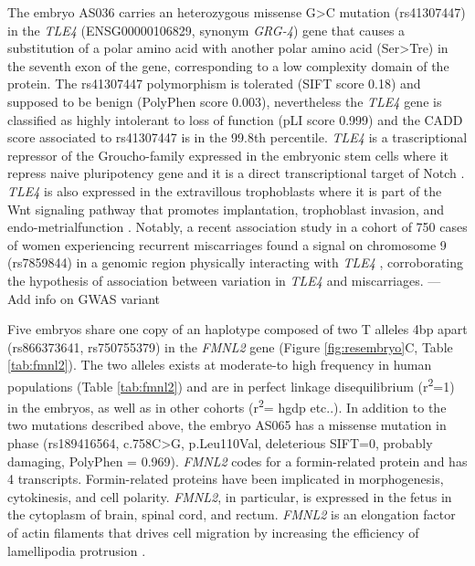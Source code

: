 \documentclass[fleqn,10pt]{wlscirep}
\begin{document}
The embryo AS036 carries an heterozygous missense G>C mutation (rs41307447) in the \textit{TLE4} (ENSG00000106829, synonym \textit{GRG-4}) gene that causes a substitution of a polar amino acid with another polar amino acid (Ser>Tre) in the seventh exon of the gene, corresponding to a low complexity domain of the protein. The rs41307447 polymorphism is tolerated (SIFT score 0.18) and supposed to be benign (PolyPhen score 0.003), nevertheless the \textit{TLE4} gene is classified as highly intolerant to loss of function (pLI score 0.999) and the CADD score associated to rs41307447 is in the 99.8th percentile. 
\textit{TLE4} is a trascriptional repressor of the Groucho-family expressed in the embryonic stem cells where it repress naive pluripotency gene \cite{laing2015gro} and it is a direct transcriptional target of Notch \cite{menchero2019transitions}. \textit{TLE4} is also expressed in the extravillous trophoblasts \cite{meinhardt2014wnt} where it is part of the Wnt signaling pathway that promotes implantation, trophoblast invasion, and endo-metrialfunction \cite{sonderegger2010wnt}. Notably, a recent association study in a cohort of 750 cases of women experiencing recurrent miscarriages found a signal on chromosome 9 (rs7859844) in a genomic region physically interacting with \textit{TLE4} \cite{laisk2019genetic}, corroborating the hypothesis of association between variation in \textit{TLE4} and miscarriages. --- Add info on GWAS variant 

Five embryos share one copy of an haplotype composed of two T alleles 4bp apart (rs866373641, rs750755379) in the \textit{FMNL2} gene (Figure \ref{fig:resembryo}C, Table \ref{tab:fmnl2}). The two alleles exists at moderate-to high frequency in human populations (Table \ref{tab:fmnl2}) and are in perfect linkage disequilibrium (r\textsuperscript{2}=1) in the embryos, as well as in other cohorts (r\textsuperscript{2}= hgdp etc..). In addition to the two mutations described above, the embryo AS065 has a missense mutation in phase (rs189416564, c.758C>G, p.Leu110Val, deleterious SIFT=0, probably damaging, PolyPhen = 0.969). \textit{FMNL2} codes for a formin-related protein and has 4 transcripts. Formin-related proteins have been implicated in morphogenesis, cytokinesis, and cell polarity. \textit{FMNL2}, in particular, is expressed in the fetus in the cytoplasm of brain, spinal cord, and rectum\cite{lizio2015gateways}. \textit{FMNL2} is an elongation factor of actin filaments that drives cell migration by increasing the efficiency of lamellipodia protrusion \cite{block2012fmnl2}. 
\end{document}

